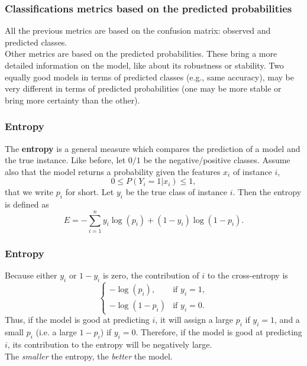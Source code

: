 \begin{frame}
\frametitle{Classifications metrics based on the predicted probabilities}
All the previous metrics are based on the confusion matrix: observed and predicted classes.\\ 
\vspace{0.3cm}
Other metrics are based on the predicted probabilities. These bring a more detailed information on the model, like about its robustness or stability. Two equally good models in terms of predicted classes (e.g., same accuracy), may be very different in terms of predicted probabilities (one may be more stable or bring more certainty than the other).
\end{frame}
\begin{frame}
\frametitle{Entropy}
The {\bf entropy} is a general measure which compares the prediction of a model and the true instance. Like before, let $0/1$ be the negative/positive classes. Assume also that the model returns a probability given the features $x_i$ of instance $i$, 
$$
0 \leq P(Y_i=1|x_i) \leq 1,
$$
that we write $p_i$ for short. Let $y_i$ be the true class of instance $i$. Then the entropy is defined as
$$
E = -\sum_{i=1}^n y_i \log(p_i) + (1-y_i)\log(1-p_i).
$$
\end{frame}
\begin{frame}
\frametitle{Entropy}
Because either $y_i$ or $1-y_i$ is zero, the contribution of $i$ to the cross-entropy is
$$
\left\{
\begin{array}{ll}
-\log(p_i), & \mbox{if } y_i=1,\\
-\log(1-p_i) & \mbox{if } y_i=0.
\end{array}
\right.
$$ 
Thus, if the model is good at predicting $i$, it will assign a large $p_i$ if $y_i=1$, and a small $p_i$ (i.e. a large $1-p_i$) if $y_i=0$. Therefore, if the model is good at predicting $i$, its contribution to the entropy will be negatively large.\\
\vspace{0.2cm}
The {\it smaller} the entropy, the {\it better} the model.
\end{frame}
